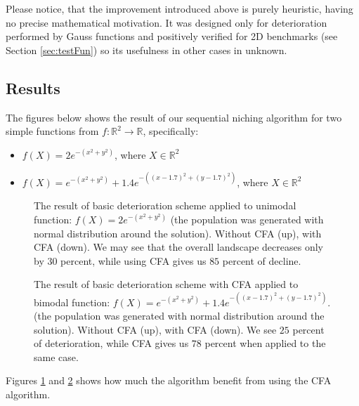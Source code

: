 Please notice, that the improvement introduced above is purely heuristic,
having no precise mathematical motivation. It was designed only
for deterioration performed by Gauss functions and positively verified for
2D benchmarks (see Section \ref{sec:testFun}) so its usefulness 
in other cases in unknown.

\subsection{Results}

The figures below shows the result of our sequential niching algorithm for two
simple functions from $f:\mathbb{R}^2 \rightarrow \mathbb{R}$, specifically:
\begin{itemize}
  \item $f(X) = 2e^{-(x^2 + y^2)}$, where $X \in \mathbb{R}^2$
  \item $f(X) = e^{-(x^2 + y^2)}+1.4e^{-((x-1.7)^2 + (y-1.7)^2)}$, where $X \in
  \mathbb{R}^2$
\end{itemize}

\begin{figure}
  \centering
  \caption{The result of basic deterioration scheme
  applied to unimodal function: $f(X) = 2e^{-(x^2 +y^2)}$ (the population was
  generated with normal distribution around the solution). Without CFA (up),
  with CFA (down). We may see that the 
  overall landscape decreases only by $30$ percent, while using CFA
  gives us $85$ percent of decline.}
  \label{fig:det1}
\end{figure}

\begin{figure}
  \centering
  \caption{The result of basic deterioration scheme with CFA 
  applied to bimodal function: $f(X) = e^{-(x^2 + y^2)}+1.4e^{-((x-1.7)^2 +
  (y-1.7)^2)}$. (the population was
  generated with normal distribution around the solution). Without CFA (up),
  with CFA (down). We see $25$ percent
  of deterioration, while CFA gives us $78$ percent when applied to the same
  case.}
  \label{fig:det2}
\end{figure}

Figures \ref{fig:det1} and \ref{fig:det2} shows how much the algorithm benefit
from using the CFA algorithm.

